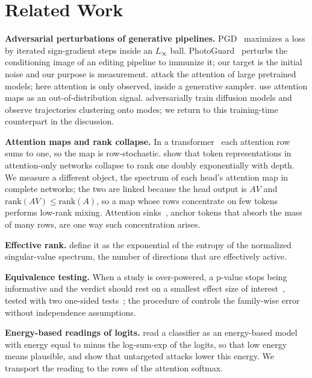 \documentclass{article}
\begin{document}
\section{Related Work}\label{sec:relatedwork}

\textbf{Adversarial perturbations of generative pipelines.} PGD~\cite{madry2018towards} maximizes a loss by iterated sign-gradient steps inside an $L_\infty$ ball. PhotoGuard~\cite{salman2023raising} perturbs the conditioning image of an editing pipeline to immunize it; our target is the initial noise and our purpose is measurement. \citet{silva2025attacking} attack the attention of large pretrained models; here attention is only observed, inside a generative sampler. \citet{cultrera2023leveraging} use attention maps as an out-of-distribution signal. \citet{briglia2025adversarial} adversarially train diffusion models and observe trajectories clustering onto modes; we return to this training-time counterpart in the discussion.

\textbf{Attention maps and rank collapse.} In a transformer~\cite{vaswani2017attention} each attention row sums to one, so the map is row-stochastic. \citet{dong2021attention} show that token representations in attention-only networks collapse to rank one doubly exponentially with depth. We measure a different object, the spectrum of each head's attention map in complete networks; the two are linked because the head output is $AV$ and $\mathrm{rank}(AV) \le \mathrm{rank}(A)$, so a map whose rows concentrate on few tokens performs low-rank mixing. Attention sinks~\cite{xiao2024efficient}, anchor tokens that absorb the mass of many rows, are one way such concentration arises.

\textbf{Effective rank.} \citet{roy2007effective} define it as the exponential of the entropy of the normalized singular-value spectrum, the number of directions that are effectively active.

\textbf{Equivalence testing.} When a study is over-powered, a p-value stops being informative and the verdict should rest on a smallest effect size of interest~\cite{lakens2017equivalence}, tested with two one-sided tests~\cite{schuirmann1987comparison}; the procedure of \citet{holm1979simple} controls the family-wise error without independence assumptions.

\textbf{Energy-based readings of logits.} \citet{grathwohl2020your} read a classifier as an energy-based model with energy equal to minus the log-sum-exp of the logits, so that low energy means plausible, and \citet{mirza2024shedding} show that untargeted attacks lower this energy. We transport the reading to the rows of the attention softmax.
\end{document}
